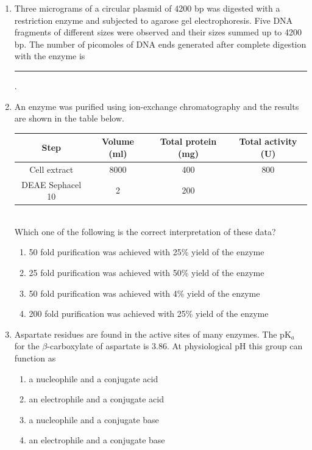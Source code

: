 \documentclass[journal,12pt,onecolumn]{IEEEtran}
\begin{document}
\begin{enumerate}[label=\arabic*.,resume]
\item Three micrograms of a circular plasmid of 4200 bp was digested with a restriction enzyme and subjected to agarose gel electrophoresis. Five DNA fragments of different sizes were observed and their sizes summed up to 4200 bp. The number of picomoles of DNA ends generated after complete digestion with the enzyme is \rule{2.5cm}{0.1pt}.

\item An enzyme was purified using ion-exchange chromatography and the results are shown in the table below.\\

\begin{tabular}{|c|c|c|c|}
\hline
Step & Volume (ml) & Total protein (mg) & Total activity (U) \\
\hline
Cell extract & 8000 & 400 & 800 \\
DEAE Sephacel 10 & 2 & 200 & \\
\hline
\end{tabular}\\

Which one of the following is the correct interpretation of these data?

\begin{enumerate}[label=(\Alph*)]
\item 50 fold purification was achieved with 25\% yield of the enzyme
\item 25 fold purification was achieved with 50\% yield of the enzyme
\item 50 fold purification was achieved with 4\% yield of the enzyme
\item 200 fold purification was achieved with 25\% yield of the enzyme
\end{enumerate}

\item Aspartate residues are found in the active sites of many enzymes. The pK$_a$ for the $\beta$-carboxylate of aspartate is 3.86. At physiological pH this group can function as

\begin{multicols}{2}
\begin{enumerate}[label=(\Alph*)]
\item a nucleophile and a conjugate acid
\item an electrophile and a conjugate acid
\item a nucleophile and a conjugate base
\item an electrophile and a conjugate base
\end{enumerate}
\end{multicols}


\end{enumerate}
\end{document}
